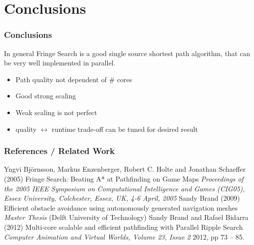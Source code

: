 \documentclass{beamer}
\begin{document}
\section{Conclusions}
\begin{frame}
\frametitle{Conclusions}
In general Fringe Search is a good single source shortest path algorithm, that can be very well implemented in parallel.\\
\begin{itemize}
\item Path quality not dependent of \# cores
\item Good strong scaling
\item Weak scaling is not perfect
\item quality $\leftrightarrow$ runtime trade-off can be tuned for desired result
\end{itemize}
\end{frame}



\begin{frame}
\frametitle{References / Related Work}
\footnotesize{
\begin{thebibliography}{99} %
 Yngvi Björnsson, Markus Enzenberger, Robert C. Holte and Jonathan Schaeffer (2005)
\newblock Fringe Search: Beating A* at Pathfinding on Game Maps
\newblock \emph{Proceedings of the 2005 IEEE Symposium on Computational Intelligence and Games (CIG05), Essex University, Colchester, Essex, UK, 4-6 April, 2005}
 Sandy Brand (2009)
\newblock Efficient obstacle avoidance using autonomously generated navigation meshes
\newblock \emph{Master Thesis} (Delft University of Technology)
 Sandy Brand and Rafael Bidarra (2012)
\newblock Multi-core scalable and efficient pathfinding with
Parallel Ripple Search
\newblock \emph{Computer Animation and Virtual Worlds, Volume 23, Issue 2} 2012, pp 73 -- 85.
\end{thebibliography}
}
\end{frame}


%
\end{document}
